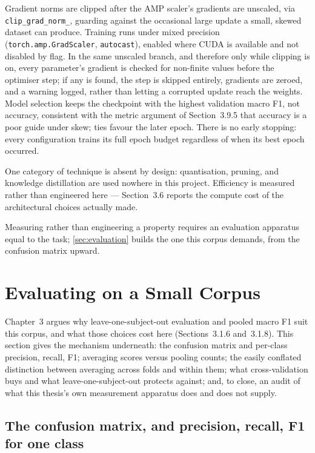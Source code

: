 Gradient norms are clipped after the AMP scaler's gradients are unscaled, via \texttt{clip\_grad\_norm\_}, guarding against the occasional large update a small, skewed dataset can produce. Training runs under mixed precision (\texttt{torch.amp.GradScaler}, \texttt{autocast}), enabled where CUDA is available and not disabled by flag. In the same unscaled branch, and therefore only while clipping is on, every parameter's gradient is checked for non-finite values before the optimiser step; if any is found, the step is skipped entirely, gradients are zeroed, and a warning logged, rather than letting a corrupted update reach the weights. Model selection keeps the checkpoint with the highest validation macro F1, not accuracy, consistent with the metric argument of Section~3.9.5 that accuracy is a poor guide under skew; ties favour the later epoch. There is no early stopping: every configuration trains its full epoch budget regardless of when its best epoch occurred.

One category of technique is absent by design: quantisation, pruning, and knowledge distillation are used nowhere in this project. Efficiency is measured rather than engineered here --- Section~3.6 reports the compute cost of the architectural choices actually made.

Measuring rather than engineering a property requires an evaluation apparatus equal to the task; \autoref{sec:evaluation} builds the one this corpus demands, from the confusion matrix upward.


\section{Evaluating on a Small Corpus}
\label{sec:evaluation}

Chapter~3 argues why leave-one-subject-out evaluation and pooled macro F1 suit this corpus, and what those choices cost here (Sections~3.1.6 and~3.1.8). This section gives the mechanism underneath: the confusion matrix and per-class precision, recall, F1; averaging scores versus pooling counts; the easily conflated distinction between averaging across folds and within them; what cross-validation buys and what leave-one-subject-out protects against; and, to close, an audit of what this thesis's own measurement apparatus does and does not supply.

\subsection{The confusion matrix, and precision, recall, F1 for one class}
\label{sec:confusion-matrix}

